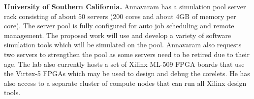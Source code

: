 \vspace{3pt}
\noindent
\textbf{University of Southern California.}
Annavaram has a simulation pool server rack consisting of about 50 servers (200 cores and about 4GB of memory per core). 
The server pool is fully configured for auto job scheduling and remote management. 
The proposed work will use and develop a variety of software simulation tools which will be simulated on the pool. 
Annavaram also requests two servers to strengthen the pool as some servers need to be retired due to their age. 
The lab also currently hosts a set of Xilinx ML-509 FPGA boards that use the Virtex-5 FPGAs which may be used to design and debug the corelets. 
He has also access to a separate cluster of compute nodes that can run all Xilinx design tools. 
